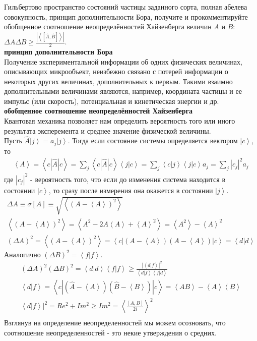 \documentclass[__main__.tex]{subfiles}
\begin{document}
Гильбертово пространство состояний частицы заданного сорта, полная абелева совокупность, принцип дополнительности Бора, получите и прокомментируйте обобщенное соотношение неопределённостей Хайзенберга величин $A$ и $B$: $\Delta{A}\Delta{B}\ge\frac{\left|\left<\left[\hat{A},\hat{B}\right]\right>\right|}{2}$.\\ 


\textbf{принцип дополнительности Бора}\\
Получение экспериментальной информации об одних физических величинах, описывающих микрообъект, неизбежно связано с потерей информации о некоторых других величинах, дополнительных к первым. Такими взаимно дополнительными величинами являются, например, координата частицы и ее импульс (или скорость), потенциальная и кинетическая энергии и др.
\textbf{обобщенное соотношение неопределённостей Хайзенберга}\\
Квантовая механика позволяет нам определить вероятность того или иного результата эксперемента и среднее значение физической величины.\\
Пусть $\hat{A}\left|j\right> = a_j \left|j\right>$. Тогда если состояние системы определяется вектором $\left|c\right>$, то\\
\begin{gather}
\left<A\right> = \left<c|\hat{A}|c\right> = \sum_j \left<c|\hat{A}|c\right>\left<j|c\right> = \sum_j \left<c|j\right>\left<j|c\right>a_j = \sum_j |c_j|^2 a_j
\end{gather}
где $|c_j|^2$ - вероятность того, что если до изменения система находится в состоянии $\left|c\right>$, то сразу после измерения она окажется в состоянии $\left|j\right>$.\\
\begin{gather}
\Delta A \equiv \sigma[A] \equiv \sqrt{\left<(A-\left<A\right>)^2\right>}\\
\left<(A-\left<A\right>)^2\right> = \left<A^2-2A\left<A\right>+\left<A\right>^2\right> = \left<A^2\right> - \left<A\right>^2\\
(\Delta A)^2 = \left<(A-\left<A\right>)^2\right> = \left< c|(A-\left<A\right>)(A-\left<A\right>)|c\right> = \left<d|d\right>
\end{gather}
Аналогично $(\Delta B)^2 = \left<f|f\right>$.\\
\begin{gather}
(\Delta A)^2(\Delta B)^2 = \left<d|d\right>\left<f|f\right> \geq \frac{|\left<d|f\right>|^2}{\left<d|f\right>\left<f|d\right>}\\
\left<d|f\right> = \left<c|(\hat{A}-\left<A\right>)(\hat{B} - \left<B\right>)|c\right> = \left<AB\right> - \left< A\right> \left< B\right>\\
\left<d|f\right>|^2 = Re^2+Im^2 \geq Im^2 = \left<\frac{[A,B]}{2i}\right>^2\\
\end{gather}
Взглянув на определение неопределенностей мы можем осозновать, что соотношение неопределенностей - это некие утверждения о средних.\\
\end{document}
